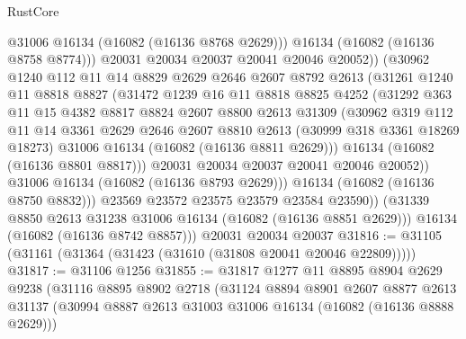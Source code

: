 \begin{lexlean}{RustCore}
\begin{coremodule}
                    @31006
                    @16134
                    (@16082 (@16136 @8768 @2629)))
                  @16134
                  (@16082 (@16136 @8758 @8774)))
                @20031
                @20034
                @20037
                @20041
                @20046
                @20052))
            (@30962
              @1240
              @112
              @11
              @14
              @8829
              @2629
              @2646
              @2607
              @8792
              @2613
              (@31261
                @1240
                @11
                @8818
                @8827
                (@31472
                  @1239
                  @16
                  @11
                  @8818
                  @8825
                  @4252
                  (@31292
                    @363
                    @11
                    @15
                    @4382
                    @8817
                    @8824
                    @2607
                    @8800
                    @2613
                    @31309
                    (@30962
                      @319
                      @112
                      @11
                      @14
                      @3361
                      @2629
                      @2646
                      @2607
                      @8810
                      @2613
                      (@30999 @318 @3361 @18269 @18273)
                      @31006
                      @16134
                      (@16082 (@16136 @8811 @2629)))
                    @16134
                    (@16082 (@16136 @8801 @8817)))
                  @20031
                  @20034
                  @20037
                  @20041
                  @20046
                  @20052))
              @31006
              @16134
              (@16082 (@16136 @8793 @2629)))
            @16134
            (@16082 (@16136 @8750 @8832)))
          @23569
          @23572
          @23575
          @23579
          @23584
          @23590))
      (@31339 @8850 @2613 @31238 @31006 @16134 (@16082 (@16136 @8851 @2629)))
      @16134
      (@16082 (@16136 @8742 @8857)))
    @20031
    @20034
    @20037
@31816 := @31105 (@31161 (@31364 (@31423 (@31610 (@31808 @20041 @20046 @22809)))))
@31817 := @31106 @1256
@31855 := @31817
    @1277
    @11
    @8895
    @8904
    @2629
    @9238
    (@31116
      @8895
      @8902
      @2718
      (@31124
        @8894
        @8901
        @2607
        @8877
        @2613
        @31137
        (@30994 @8887 @2613 @31003 @31006 @16134 (@16082 (@16136 @8888 @2629)))

\end{coremodule}
\end{lexlean}

